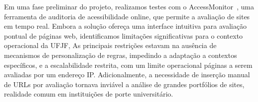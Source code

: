 \documentclass[article,12pt,oneside,a4paper,hyphens]{abntex2}
\begin{document}
Em uma fase preliminar do projeto, realizamos testes com o AccessMonitor~\autocite{AM}, 
uma ferramenta de auditoria de acessibilidade online, que permite a avaliação de 
sites em tempo real. Embora a solução ofereça uma interface intuitiva para 
avaliação pontual de páginas web, identificamos limitações significativas para o 
contexto operacional da UFJF, As principais restrições estavam na ausência de 
mecanismos de personalização de regras, impedindo a adaptação a contextos 
específicos, e a escalabilidade restrita, com um limite operacional páginas a 
serem avaliadas por um endereço IP\@. Adicionalmente, a necessidade de inserção 
manual de URLs por avaliação tornava inviável a análise de grandes portfólios de 
sites, realidade comum em instituições de porte universitário.

\nocite{*}
\end{document}
